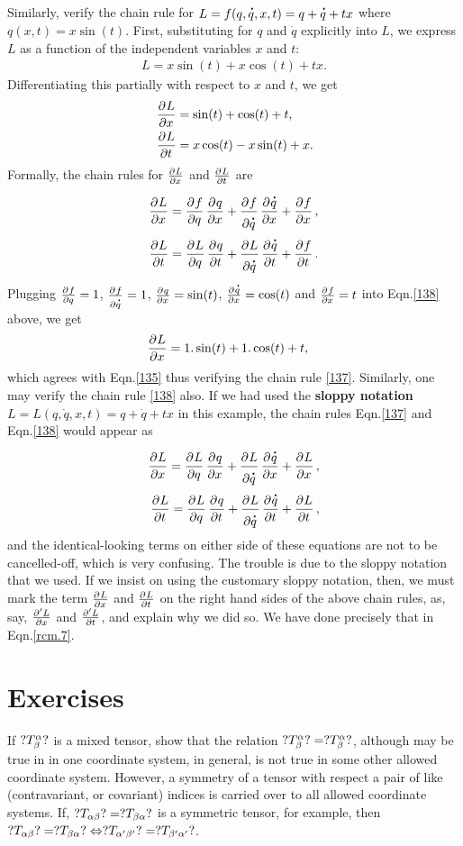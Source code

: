\exm Similarly, verify the chain rule for  
$L=f(q,\dot{q},x,t) \break =q+\dot{q}+tx$ where  $q(x,t)=x\sin(t)$.
\soln First, substituting for $q$ and $\dot{q}$ explicitly 
into $L$, we express $L$ as a function of the independent 
variables $x$ and $t$:
\begin{align}\label{134}
L=x \sin (t)+x\cos(t)+tx.
 \end{align}
Differentiating this partially with respect to $x$ and $t$, 
we get
\begin{align}\label{135}
&\dpd{L}{x}=\sin (t)+\cos(t)+t,\\\label{136}
&\dpd{L}{t}=x\cos(t)-x\sin(t)+x.
 \end{align}
Formally, the chain rules for $\pd{L}{x}$ and $\pd{L}{t}$ 
are
\begin{align}\label{137}
\dpd{L}{x}=\dpd{f}{q}\dpd{q}{x}+\dpd{f}{\dot{q}}
\dpd{\dot{q}}{x}+\dpd{f}{x},\\\label{138}
\dpd{L}{t}=\dpd{L}{q}\dpd{q}{t}+\dpd{L}{\dot{q}}
\dpd{\dot{q}}{t}+\dpd{f}{t}.
\end{align}
Plugging $\pd{f}{q}=1$, $\pd{f}{\dot{q}}=1$, 
$\pd{q}{x}=\sin(t)$, $\pd{\dot{q}}{x}=\cos(t)$ and 
$\pd{f}{x}=t$ into Eqn.\eqref{138} above, we get
\begin{align}\label{139}
 \dpd{L}{x}&= 1.\sin(t)+1.\cos(t)+t,
 \end{align}
which agrees with Eqn.\eqref{135} thus verifying the chain 
rule \eqref{137}. Similarly, one may verify the chain rule 
\eqref{138} also.
 If we had used the \textbf{sloppy notation} 
$L=L(q,\dot{q},x,t)  =q+\dot{q}+tx$ in this example, the 
chain rules Eqn.\eqref{137} and  Eqn.\eqref{138} would 
appear as
\begin{align*}
\dpd{L}{x}=\dpd{L}{q}\dpd{q}{x}+\dpd{L}{\dot{q}}
\dpd{\dot{q}}{x}+\dpd{L}{x},\\
\dpd{L}{t}=\dpd{L}{q}\dpd{q}{t}+\dpd{L}{\dot{q}}
\dpd{\dot{q}}{t}+\dpd{L}{t},
\end{align*}
and the identical-looking terms on either side of these 
equations are not to be cancelled-off, which is very 
confusing. The trouble is due to the sloppy notation that 
we 
used. If we insist on using the customary sloppy notation, 
then, we must mark the term $\pd{L}{x}$ and $\pd{L}{t}$ on 
the right hand sides of the above chain rules, as, say, 
$\frac{{\partial}' L}{{\partial} x}$ and $\frac{{\partial}' L}{{\partial} t}$, and 
explain why we did so. We have done  precisely that in 
Eqn.\eqref{rcm.7}.

\section*{Exercises}
\exise If $?T^{{\alpha}}_{{\beta}}?$ is a mixed tensor, show that 
the relation  $?T^{{\alpha}}_{{\beta}}?=?T_{{\beta}}^{{\alpha}}?$, 
although may be true in in one coordinate system,  in 
general, is not true in some other allowed coordinate 
system. However, a symmetry of a tensor with respect a pair 
of like (contravariant, or covariant) indices is carried 
over to all allowed coordinate systems. If, 
$?T_{{\alpha}{\beta}}?=?T_{{\beta}{\alpha}}?$ is a symmetric tensor, for 
example, then $?T_{{\alpha}{\beta}}?=?T_{{\beta}{\alpha}}? 
\Leftrightarrow ?T_{{\alpha}'{\beta}'}?= ?T_{{\beta}'{\alpha}'}?$.

